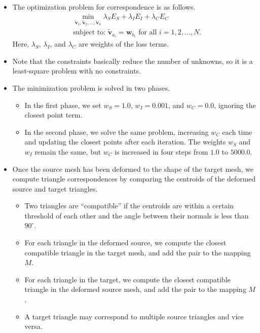 \documentclass[10pt]{article}
\newcommand{\ve}[1]{\mathbf{#1}}
\begin{document}
\begin{itemize}
\begin{itemize}
        \item A grid-based spatial sorting algorithm accelerates the closest point computation for this loss.
    \end{itemize}

    \item The optimization problem for correspondence is as follows.
    \begin{align*}
            &\min_{\widetilde{\ve{v}}_1, \widetilde{\ve{v}}_2, \ldots, \widetilde{\ve{v}}_n} \lambda_S E_S + \lambda_I E_I + \lambda_C E_C \\
            &\mbox{subject to: } \widetilde{\ve{v}}_{a_i} = \ve{w}_{b_i} \mbox{ for all } i = 1, 2, \ldots, N.
    \end{align*}
    Here, $\lambda_S$, $\lambda_I$, and $\lambda_C$ are weights of the loss terms.

    \item Note that the constraints basically reduce the number of unknowns, so it is a least-square problem with no constraints.

    \item The minimization problem is solved in two phases.
    \begin{itemize}
        \item In the first phase, we set $w_S = 1.0$, $w_I = 0.001$, and $w_C = 0.0$, ignoring the closest point term.
        \item In the second phase, we solve the same problem, increasing $w_C$ each time and updating the closest points after each iteration. The weights $w_S$ and $w_I$ remain the same, but $w_C$ is increased in four steps from $1.0$ to $5000.0$.
    \end{itemize}

    \item Once the source mesh has been deformed to the shape of the target mesh, we compute triangle correspondences by comparing the centroids of the deformed source and target triangles.
    \begin{itemize}
        \item Two triangles are ``compatible'' if the centroids are within a certain threshold of each other and the angle between their normals is less than $90^\circ$.
        
        \item For each triangle in the deformed source, we compute the closest compatible triangle in the target mesh, and add the pair to the mapping $M$.
        
        \item For each triangle in the target, we compute the closest compatible triangle in the deformed source mesh, and add the pair to the mapping $M$.
        
        \item A target triangle may correspond to multiple source triangles and vice versa.
    \end{itemize}
\end{itemize}
\end{document}
